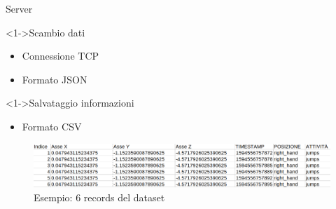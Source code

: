 \begin{tframe}{Server}

    \begin{block}<1->{Scambio dati}
        
        \begin{itemize}
            \item Connessione TCP
            \item Formato JSON
        \end{itemize}
        
    \end{block}

    \begin{block}<1->{Salvataggio informazioni}
        
        \begin{itemize}
            \item Formato CSV
        \end{itemize}

        \begin{figure}
            \centering
            \includegraphics[width=1.00\columnwidth]{assets/images/intro/dataset-data-example.png}
            \caption*{Esempio: 6 records del dataset}
        \end{figure}    
        
    \end{block}

\end{tframe}